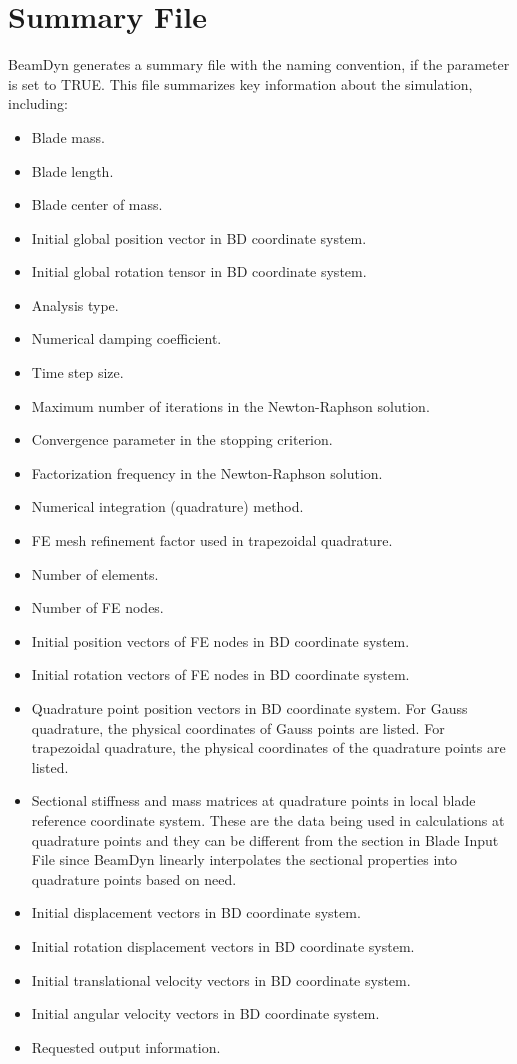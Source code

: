 \section{Summary File}
\label{sec:SumFile}
BeamDyn generates a summary file with the naming convention,   if the   parameter is set to TRUE. 
This file summarizes key information about the simulation, including:
\begin{itemize}
  \item Blade mass.
  \item Blade length.
  \item Blade center of mass.
  \item Initial global position vector in BD coordinate system.
  \item Initial global rotation tensor in BD coordinate system.
  \item Analysis type.
  \item Numerical damping coefficient.
  \item Time step size.
  \item Maximum number of iterations in the Newton-Raphson solution.
  \item Convergence parameter in the stopping criterion.
  \item Factorization frequency in the Newton-Raphson solution.
  \item Numerical integration (quadrature) method.
  \item FE mesh refinement factor used in trapezoidal quadrature.
  \item Number of elements.
  \item Number of FE nodes.
  \item Initial position vectors of FE nodes in BD coordinate system.
  \item Initial rotation vectors of FE nodes in BD coordinate system.
  \item Quadrature point position vectors in BD coordinate system. For Gauss quadrature, the physical coordinates of Gauss points are listed. For trapezoidal quadrature, the physical coordinates of the quadrature points are listed.
  \item Sectional stiffness and mass matrices at quadrature points in local blade reference coordinate system. These are the data being used in calculations at quadrature points and they can be different from the section in Blade Input File since BeamDyn linearly interpolates the sectional properties into quadrature points based on need.
  \item Initial displacement vectors in BD coordinate system.
  \item Initial rotation displacement vectors in BD coordinate system.
  \item Initial translational velocity vectors in BD coordinate system.
  \item Initial angular velocity vectors in BD coordinate system.
  \item Requested output information.
\end{itemize}
